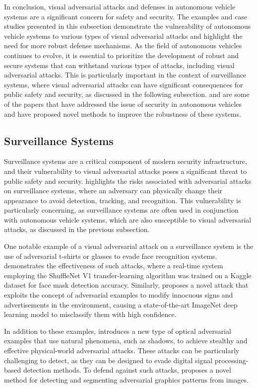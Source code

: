 \documentclass[11pt]{article}
\begin{document}
In conclusion, visual adversarial attacks and defenses in autonomous vehicle systems are a significant concern for safety and security. The examples and case studies presented in this subsection demonstrate the vulnerability of autonomous vehicle systems to various types of visual adversarial attacks and highlight the need for more robust defense mechanisms. As the field of autonomous vehicles continues to evolve, it is essential to prioritize the development of robust and secure systems that can withstand various types of attacks, including visual adversarial attacks. This is particularly important in the context of surveillance systems, where visual adversarial attacks can have significant consequences for public safety and security, as discussed in the following subsection. \cite{ref191} and \cite{ref192} are some of the papers that have addressed the issue of security in autonomous vehicles and have proposed novel methods to improve the robustness of these systems.

\subsection{Surveillance Systems}

Surveillance systems are a critical component of modern security infrastructure, and their vulnerability to visual adversarial attacks poses a significant threat to public safety and security. \cite{ref193} highlights the risks associated with adversarial attacks on surveillance systems, where an adversary can physically change their appearance to avoid detection, tracking, and recognition. This vulnerability is particularly concerning, as surveillance systems are often used in conjunction with autonomous vehicle systems, which are also susceptible to visual adversarial attacks, as discussed in the previous subsection.

One notable example of a visual adversarial attack on a surveillance system is the use of adversarial t-shirts or glasses to evade face recognition systems. \cite{ref194} demonstrates the effectiveness of such attacks, where a real-time system employing the ShuffleNet V1 transfer-learning algorithm was trained on a Kaggle dataset for face mask detection accuracy. Similarly, \cite{ref182} proposes a novel attack that exploits the concept of adversarial examples to modify innocuous signs and advertisements in the environment, causing a state-of-the-art ImageNet deep learning model to misclassify them with high confidence.

In addition to these examples, \cite{ref18} introduces a new type of optical adversarial examples that use natural phenomena, such as shadows, to achieve stealthy and effective physical-world adversarial attacks. These attacks can be particularly challenging to detect, as they can be designed to evade digital signal processing-based detection methods. To defend against such attacks, \cite{ref195} proposes a novel method for detecting and segmenting adversarial graphics patterns from images.
\end{document}
